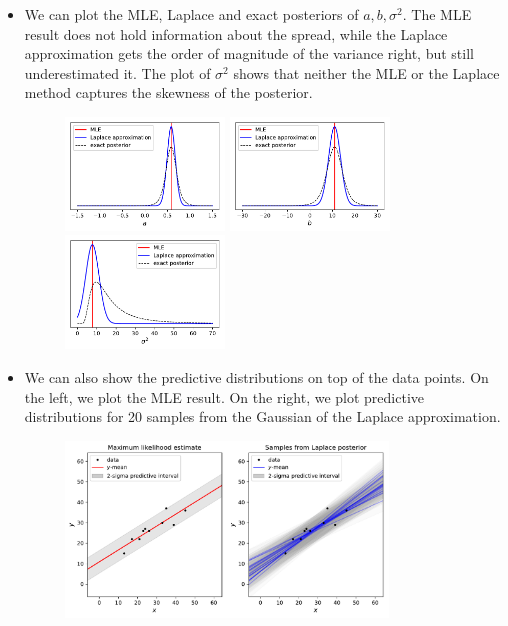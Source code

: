 \begin{itemize}
	\item We can plot the MLE, Laplace and exact posteriors of $a, b, \sigma^2$. The MLE result does not hold information about the spread, while the Laplace approximation gets the order of magnitude of the variance right, but still underestimated it. The plot of $\sigma^2$ shows that neither the MLE or the Laplace method captures the skewness of the posterior.
\begin{figure}[h]
	\centering
		\includegraphics[width=0.40\textwidth]{./figs/06-a.pdf}
		\includegraphics[width=0.40\textwidth]{./figs/06-b.pdf}\\
		\includegraphics[width=0.40\textwidth]{./figs/06-sigma2.pdf}
\end{figure}
\newpage
	\item We can also show the predictive distributions on top of the data points. On the left, we plot the MLE result. On the right, we plot predictive distributions for 20 samples from the Gaussian of the Laplace approximation.
\begin{figure}[h]
	\centering
		\includegraphics[width=0.81\textwidth]{./figs/06-linear-regression.pdf}
\end{figure}
\end{itemize}











